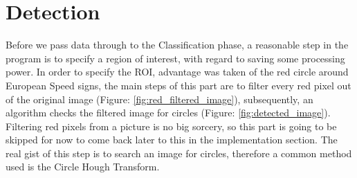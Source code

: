 \section{Detection}
Before we pass data through to the Classification phase, a reasonable step in the program is to specify a region of interest, with regard to saving some processing power. In order to specify the ROI, advantage was taken of the red circle around European Speed signs, the main steps of this part are to filter every red pixel out of the original image (Figure: \ref{fig:red_filtered_image}), subsequently, an algorithm checks the filtered image for circles (Figure: \ref{fig:detected_image}). Filtering red pixels from a picture is no big sorcery, so this part is going to be skipped for now to come back later to this in the implementation section. The real gist of this step is to search an image for circles, therefore a common method used is the Circle Hough Transform. 
